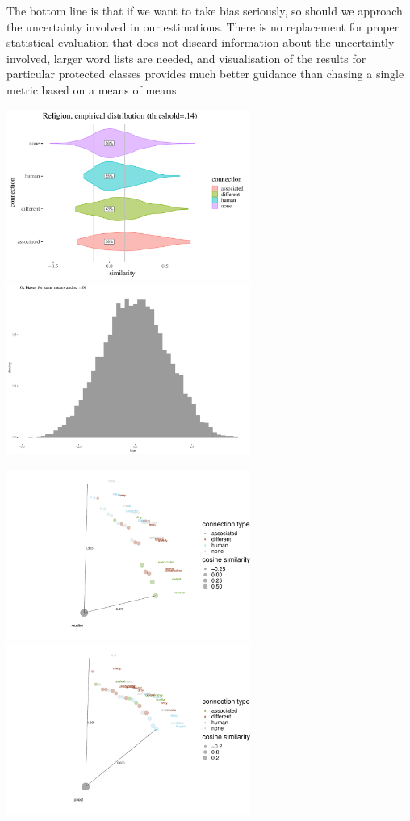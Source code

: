 \documentclass[
  12pt,
  dvipsnames,enabledeprecatedfontcommands]{scrartcl}
\begin{document}
The bottom line is that if we want to take bias seriously, so should we
approach the uncertainty involved in our estimations. There is no
replacement for proper statistical evaluation that does not discard
information about the uncertaintly involved, larger word lists are
needed, and visualisation of the results for particular protected
classes provides much better guidance than chasing a single metric based
on a means of means.

\pagebreak

\includegraphics[width=8cm]{violinReligion.pdf}
\includegraphics[width=8cm]{simulations.pdf}

\includegraphics[width=8cm]{muslim.pdf}
\includegraphics[width=8cm]{priest.pdf}
\end{document}
